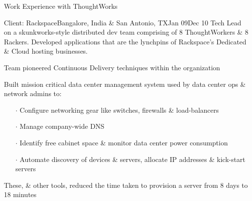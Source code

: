 \documentclass{resume} %
\begin{document}
\begin{rSection}{Work Experience with ThoughtWorks}

\begin{rSubsection}{Client: Rackspace}{Bangalore, India \& San Antonio,
  TX}{Jan 09}{Dec
    10}
{Tech Lead on a skunkworks-style distributed dev team comprising of 8
  ThoughtWorkers \& 8 Rackers. Developed applications that are the
  lynchpins of Rackspace's Dedicated \& Cloud hosting businesses.}

\item Team pioneered Continuous Delivery techniques within the organization
\item Built mission critical data center management system used by
  data center ops \& network admins to:
\vspace{-0.5em}
\begin{itemize}  \itemsep0.5pt \parskip0pt
    \item[$\cdot$] Configure networking gear like switches, firewalls \& load-balancers
    \item[$\cdot$] Manage company-wide DNS
    \item[$\cdot$] Identify free cabinet space \& monitor data center power consumption
    \item[$\cdot$] Automate discovery of devices \& servers, allocate IP addresses \& kick-start servers
\end{itemize}
\item These, \& other tools, reduced the time taken to provision a server from 8 days to 18 minutes
\end{rSubsection}

\end{rSection}

\end{document}

